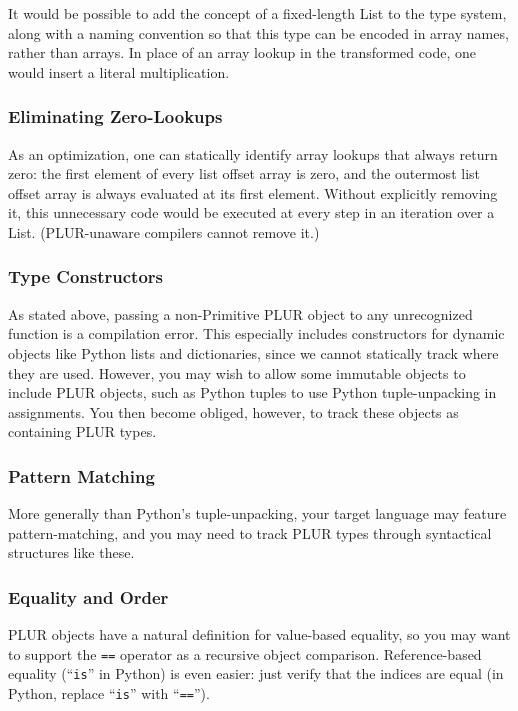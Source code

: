 \documentclass[10pt, conference, compsocconf]{IEEEtran}
\begin{document}
It would be possible to add the concept of a fixed-length List to the type system, along with a naming convention so that this type can be encoded in array names, rather than arrays. In place of an array lookup in the transformed code, one would insert a literal multiplication.

\subsubsection{Eliminating Zero-Lookups}

As an optimization, one can statically identify array lookups that always return zero: the first element of every list offset array is zero, and the outermost list offset array is always evaluated at its first element. Without explicitly removing it, this unnecessary code would be executed at every step in an iteration over a List. (PLUR-unaware compilers cannot remove it.)

\subsubsection{Type Constructors}

As stated above, passing a non-Primitive PLUR object to any unrecognized function is a compilation error. This especially includes constructors for dynamic objects like Python lists and dictionaries, since we cannot statically track where they are used. However, you may wish to allow some immutable objects to include PLUR objects, such as Python tuples to use Python tuple-unpacking in assignments. You then become obliged, however, to track these objects as containing PLUR types.

\subsubsection{Pattern Matching}

More generally than Python's tuple-unpacking, your target language may feature pattern-matching, and you may need to track PLUR types through syntactical structures like these.

\subsubsection{Equality and Order}

PLUR objects have a natural definition for value-based equality, so you may want to support the {\tt ==} operator as a recursive object comparison. Reference-based equality (``{\tt is}'' in Python) is even easier: just verify that the indices are equal (in Python, replace ``{\tt is}'' with ``{\tt ==}'').
\end{document}
